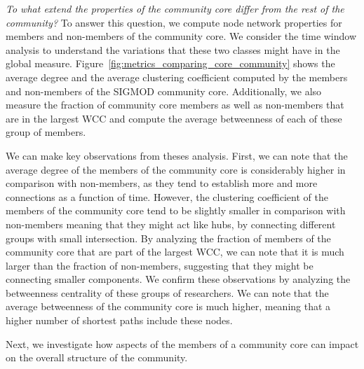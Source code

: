 \documentclass[letterpaper]{www13-companion-accepted}
\begin{document}
\textit{To what extend the properties of the community core differ from the rest of the community?}  To answer this question, we compute node network properties for members and non-members of the community
core. We consider the time window analysis to understand the variations that these two classes might have in the global measure.
Figure~\ref{fig:metrics_comparing_core_community} shows the average degree and the average clustering coefficient computed by the members and non-members of the SIGMOD 
community core. Additionally, we also measure the fraction of community core members as well as non-members that are in the largest WCC and compute the average betweenness of
each of these group of members. 

We can make key observations
from theses analysis. First, we can note that the average degree of the members of the community core is considerably higher in comparison with non-members, as they tend to establish more and
more connections as a function of time. However, the clustering coefficient of the members of the community core tend to be slightly smaller in comparison with non-members meaning that they
might act like hubs, by connecting different groups with small intersection. By analyzing the fraction of members of the community core that are part of the largest
WCC, we can note that it is much larger than the fraction of non-members, suggesting that they might be connecting smaller components. 
We confirm these observations by analyzing the betweenness centrality of these groups of researchers. We can note that the average betweenness of the community core is much higher,
meaning that a higher number of shortest paths include these nodes. 

Next, we investigate how aspects of the members of a community core can impact on the overall structure of the community.
\end{document}
